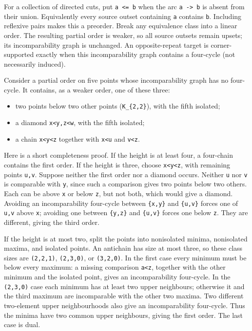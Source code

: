 \documentclass[
  10pt,
]{article}
\providecommand{\tightlist}{%
  \setlength{\itemsep}{0pt}\setlength{\parskip}{0pt}}
\begin{document}
For a collection of directed cuts, put \texttt{a\ \textless{}=\ b} when
the arc \texttt{a\ -\textgreater{}\ b} is absent from their union.
Equivalently every source outset containing \texttt{a} contains
\texttt{b}. Including reflexive pairs makes this a preorder. Break any
equivalence class into a linear order. The resulting partial order is
weaker, so all source outsets remain upsets; its incomparability graph
is unchanged. An opposite-repeat target is corner-supported exactly when
this incomparability graph contains a four-cycle (not necessarily
induced).

Consider a partial order on five points whose incomparability graph has
no four-cycle. It contains, as a weaker order, one of these three:

\begin{itemize}
\tightlist
\item
  two points below two other points (\texttt{K\_\{2,2\}}), with the
  fifth isolated;
\item
  a diamond \texttt{x\textless{}y,z\textless{}w}, with the fifth
  isolated;
\item
  a chain \texttt{x\textless{}y\textless{}z} together with
  \texttt{x\textless{}u} and \texttt{v\textless{}z}.
\end{itemize}

Here is a short completeness proof. If the height is at least four, a
four-chain contains the first order. If the height is three, choose
\texttt{x\textless{}y\textless{}z}, with remaining points \texttt{u,v}.
Suppose neither the first order nor a diamond occurs. Neither \texttt{u}
nor \texttt{v} is comparable with \texttt{y}, since such a comparison
gives two points below two others. Each can be above \texttt{x} or below
\texttt{z}, but not both, which would give a diamond. Avoiding an
incomparability four-cycle between \texttt{\{x,y\}} and \texttt{\{u,v\}}
forces one of \texttt{u,v} above \texttt{x}; avoiding one between
\texttt{\{y,z\}} and \texttt{\{u,v\}} forces one below \texttt{z}. They
are different, giving the third order.

If the height is at most two, split the points into nonisolated minima,
nonisolated maxima, and isolated points. An antichain has size at most
three, so these class sizes are \texttt{(2,2,1)}, \texttt{(2,3,0)}, or
\texttt{(3,2,0)}. In the first case every minimum must be below every
maximum: a missing comparison \texttt{a\textless{}z}, together with the
other minimum and the isolated point, gives an incomparability
four-cycle. In the \texttt{(2,3,0)} case each minimum has at least two
upper neighbours; otherwise it and the third maximum are incomparable
with the other two maxima. Two different two-element upper
neighbourhoods also give an incomparability four-cycle. Thus the minima
have two common upper neighbours, giving the first order. The last case
is dual.
\end{document}
